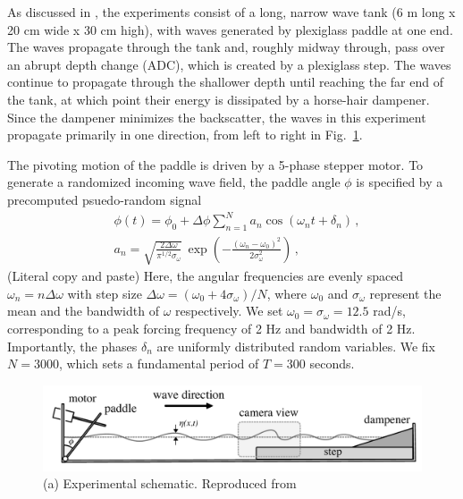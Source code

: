 \documentclass[11pt]{article}
\newcommand{\omavg}{\omega_0}
\newcommand{\omsig}{\sigma_{\omega}}
\begin{document}
	As discussed in \cite{bolles2019anomalous}, the experiments consist of a long, narrow wave tank (6 m long x 20 cm wide x 30 cm high), with waves generated by plexiglass paddle at one end. The waves propagate through the tank and, roughly midway through, pass over an abrupt depth change (ADC), which is created by a plexiglass step. The waves continue to propagate through the shallower depth until reaching the far end of the tank, at which point their energy is dissipated by a horse-hair dampener. Since the dampener minimizes the backscatter, the waves in this experiment propagate primarily in one direction, from left to right in Fig.~\ref{fig1}. 

The pivoting motion of the paddle is driven by a 5-phase stepper motor. To generate a randomized incoming wave field, the paddle angle $\phi$ is specified by a precomputed psuedo-random signal
\begin{align}
\label{PaddleAngle}
& \phi(t) = \phi_0 + \Delta \phi \sum_{n=1}^N a_n \cos(\omega_n t+\delta_n) \, , \\
\label{anEq}
& a_n = \sqrt{\frac{2 \Delta \omega}{\pi^{1/2} \omsig}} \, 
\exp \left( -\frac{(\omega_n - \omavg)^2}{2 \omsig^2} \right) \, ,
\end{align}
(Literal copy and paste) Here, the angular frequencies are evenly spaced $\omega_n = n  \Delta \omega$ with step size $ \Delta \omega = (\omavg+4 \omsig)/N$, where $\omavg$ and $\omsig$ represent the mean and the bandwidth of $\omega$ respectively. We set $\omavg = \omsig = 12.5$ rad/s, corresponding to a peak forcing frequency of 2 Hz and bandwidth of 2 Hz. Importantly, the phases $\delta_n$ are uniformly distributed random variables. We fix $N = 3000$, which sets a fundamental period of $T = 300$ seconds.
	
\begin{figure}%
\begin{center}
\includegraphics[width = 0.85 \linewidth]{Figs/fig1.pdf}
\caption{
(a) Experimental schematic. Reproduced from \cite{bolles2019anomalous}
}
\label{fig1}
\end{center}
\end{figure}
\end{document}

